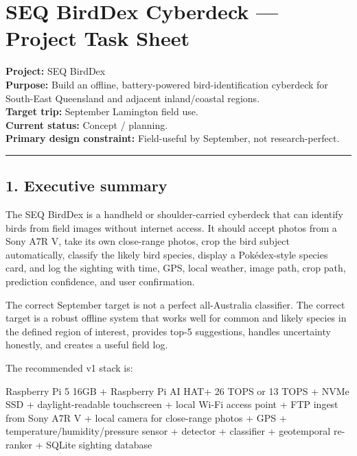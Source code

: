 \documentclass[
  11pt,
]{article}
\author{}
\date{}
\newenvironment{Shaded}{}{}
\newcommand{\NormalTok}[1]{#1}
\begin{document}
{
\hypersetup{linkcolor=}
\setcounter{tocdepth}{3}
}
\section{SEQ BirdDex Cyberdeck --- Project Task
Sheet}\label{seq-birddex-cyberdeck-project-task-sheet}

\textbf{Project:} SEQ BirdDex\\
\textbf{Purpose:} Build an offline, battery-powered bird-identification
cyberdeck for South-East Queensland and adjacent inland/coastal
regions.\\
\textbf{Target trip:} September Lamington field use.\\
\textbf{Current status:} Concept / planning.\\
\textbf{Primary design constraint:} Field-useful by September, not
research-perfect.

\begin{center}\rule{0.5\linewidth}{0.5pt}\end{center}

\subsection{1. Executive summary}\label{executive-summary}

The SEQ BirdDex is a handheld or shoulder-carried cyberdeck that can
identify birds from field images without internet access. It should
accept photos from a Sony A7R V, take its own close-range photos, crop
the bird subject automatically, classify the likely bird species,
display a Pokédex-style species card, and log the sighting with time,
GPS, local weather, image path, crop path, prediction confidence, and
user confirmation.

The correct September target is not a perfect all-Australia classifier.
The correct target is a robust offline system that works well for common
and likely species in the defined region of interest, provides top-5
suggestions, handles uncertainty honestly, and creates a useful field
log.

The recommended v1 stack is:

\begin{Shaded}
\begin{Highlighting}[]
\NormalTok{Raspberry Pi 5 16GB}
\NormalTok{+ Raspberry Pi AI HAT+ 26 TOPS or 13 TOPS}
\NormalTok{+ NVMe SSD}
\NormalTok{+ daylight{-}readable touchscreen}
\NormalTok{+ local Wi{-}Fi access point}
\NormalTok{+ FTP ingest from Sony A7R V}
\NormalTok{+ local camera for close{-}range photos}
\NormalTok{+ GPS + temperature/humidity/pressure sensor}
\NormalTok{+ detector + classifier + geotemporal re{-}ranker}
\NormalTok{+ SQLite sighting database}
\end{Highlighting}
\end{Shaded}
\end{document}
